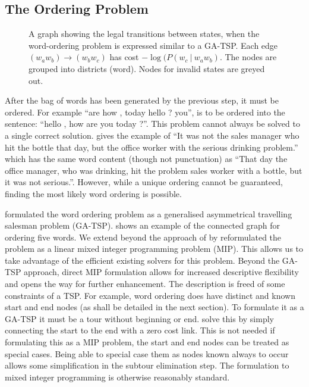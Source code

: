 \documentclass[11pt]{article}
\theoremstyle{plain}
\theoremstyle{definition}
\newcommand{\textcite}{\protect\newcite}
\begin{document}
\subsection{The Ordering Problem} \label{ordering}
\begin{figure*}
	\begin{center}
	
	\end{center}
	\caption{\label{fig:ordergraph} A graph showing the legal transitions between states, when the word-ordering problem is expressed similar to a GA-TSP. Each edge $(w_aw_b)\to (w_bw_c)$ has cost $-\log(P(w_c\:|\:w_aw_b)$. The nodes are grouped into districts (word). Nodes for invalid states are greyed out.} 
\end{figure*}

After the bag of words has been generated by the previous step, it must be ordered. For example ``are how , today hello ? you'', is to be ordered into the sentence: ``hello , how are you today ?''. This problem cannot always be solved to a single correct solution. \textcite{Mitchell2008}  gives the example of ``It was not the sales manager who hit the bottle that day, but the office worker with the serious drinking problem.'' which has the same word content (though not punctuation) as ``That day the office manager, who was drinking, hit the problem sales worker with a bottle, but it was not serious.''. However, while a unique ordering cannot be guaranteed, finding the most likely word ordering is possible.

\textcite{Horvat2014} formulated the word ordering problem as a generalised asymmetrical travelling salesman problem (GA-TSP).  shows an example of the connected graph for ordering five words. We extend beyond the approach of \textcite{Horvat2014} by reformulated the problem as a linear mixed integer programming problem (MIP). This allows us to take advantage of the efficient existing solvers for this problem. 
Beyond the GA-TSP approach, direct MIP formulation allows for increased descriptive flexibility and opens the way for further enhancement. The description is freed of some constraints of a TSP.  For example, word ordering does have distinct and known start and end nodes (as shall be detailed in the next section). To formulate it as a GA-TSP it must be a tour without beginning or end. \textcite{Horvat2014} solve this by simply connecting the start to the end with a zero cost link. This is not needed if formulating this as a MIP problem, the start and end nodes can be treated as special cases. Being able to special case them as nodes known always to occur allows some simplification in the subtour elimination step. The formulation to mixed integer programming is otherwise reasonably standard.
\end{document}
